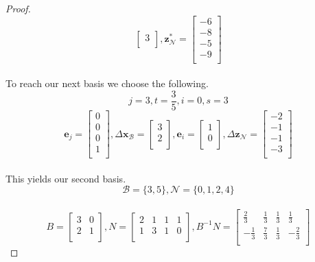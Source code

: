 \documentclass[12pt,oneside]{amsart}
\numberwithin{equation}{section}
\numberwithin{figure}{section}
\theoremstyle{plain}
\theoremstyle{definition}
\begin{document}
\begin{proof}
\[\begin{bmatrix}
  3 \\
\end{bmatrix},\mathbf{z}^*_{\mathscr{N}} = \begin{bmatrix}
  -6 \\
  -8 \\
  -5 \\
  -9 \\
\end{bmatrix}\] \\
To reach our next basis we choose the following. \\
\[j=3,t=\frac{3}{5},i=0,s=3\] 
\[\mathbf{e}_j = \begin{bmatrix}
  0 \\
  0 \\
  0 \\
  1 \\
\end{bmatrix},\Delta\mathbf{x}_{\mathscr{B}} = \begin{bmatrix}
  3 \\
  2 \\
\end{bmatrix},\mathbf{e}_i = \begin{bmatrix}
  1 \\
  0 \\
\end{bmatrix},\Delta\mathbf{z}_{\mathscr{N}} = \begin{bmatrix}
  -2 \\
  -1 \\
  -1 \\
  -3 \\
\end{bmatrix}\] \\
This yields our second basis. \\
\[\mathscr{B} = \{3,5\},\mathscr{N} = \{0,1,2,4\}\] \\
\[B = \begin{bmatrix}
  3 & 0 \\
  2 & 1 \\
\end{bmatrix},N = \begin{bmatrix}
  2 & 1 & 1 & 1 \\
  1 & 3 & 1 & 0 \\
\end{bmatrix},B^{-1}N = \begin{bmatrix}
  \frac{2}{3}  & \frac{1}{3} & \frac{1}{3} & \frac{1}{3}  \\
  -\frac{1}{3} & \frac{7}{3} & \frac{1}{3} & -\frac{2}{3} \\

\end{bmatrix}\]
\end{proof}
\end{document}
